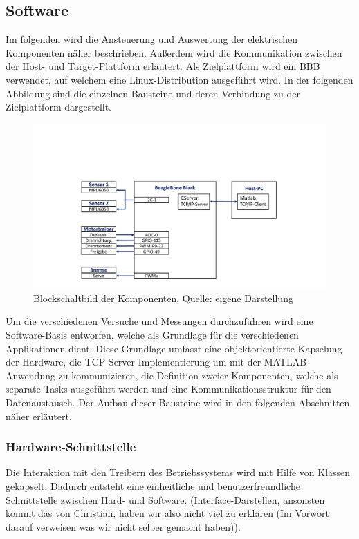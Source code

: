 \subsection{Software}
Im folgenden wird die Ansteuerung und Auswertung der elektrischen Komponenten näher beschrieben. Außerdem wird die Kommunikation zwischen der Host- und Target-Plattform erläutert. Als Zielplattform wird ein \ac{BBB} verwendet, auf welchem eine Linux-Distribution ausgeführt wird. In der folgenden Abbildung sind die einzelnen Bausteine und deren Verbindung zu der Zielplattform dargestellt.

\begin{figure}[!h]
\centering
\includegraphics[width=0.8\linewidth, trim={4cm 1cm 5cm 6cm},clip]{img/ElekAufbau_Kommunikation}
\caption{Blockschaltbild der Komponenten, Quelle: eigene Darstellung}
\end{figure}

Um die verschiedenen Versuche und Messungen durchzuführen wird eine Software-Basis entworfen, welche als Grundlage für die verschiedenen Applikationen dient. Diese Grundlage umfasst eine objektorientierte Kapselung der Hardware, die TCP-Server-Implementierung um mit der MATLAB-Anwendung zu kommunizieren, die Definition zweier Komponenten, welche als separate Tasks ausgeführt werden und eine Kommunikationsstruktur für den Datenaustausch. Der Aufbau dieser Bausteine wird in den folgenden Abschnitten näher erläutert.

\subsubsection{Hardware-Schnittstelle}
Die Interaktion mit den Treibern des Betriebssystems wird mit Hilfe von Klassen gekapselt. Dadurch entsteht eine einheitliche und benutzerfreundliche Schnittstelle zwischen Hard- und Software. (Interface-Darstellen, ansonsten kommt das von Christian, haben wir also nicht viel zu erklären (Im Vorwort darauf verweisen was wir nicht selber gemacht haben)).


